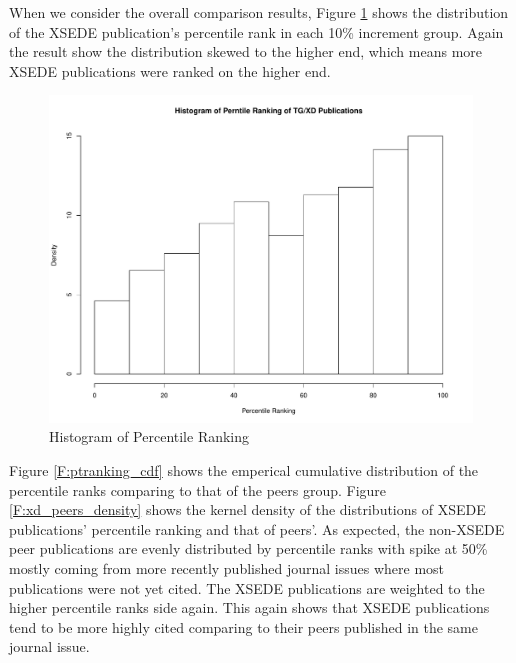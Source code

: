 \documentclass{sig-alternate}
\begin{document}
When we consider the overall comparison results, Figure \ref{F:ptranking_hist} shows
the distribution of the XSEDE publication's percentile rank in each 10\% increment group.
Again the result show the distribution skewed to the higher end, which means more
XSEDE publications were ranked on the higher end.

\begin{figure}[htb!]
    \includegraphics[width=0.95\columnwidth]{images/ptranking_histogram.pdf}
    \caption{Histogram of Percentile Ranking}
    \label{F:ptranking_hist}
\end{figure}

Figure \ref{F:ptranking_cdf} shows the emperical cumulative distribution of the
percentile ranks comparing to that of the peers group.
Figure \ref{F:xd_peers_density} shows the kernel density of the distributions
of XSEDE publications' percentile ranking and that of peers'. As expected,
the non-XSEDE peer publications are evenly distributed by percentile
ranks with spike at 50\% mostly coming from more recently published journal
issues where most publications were not yet cited. The XSEDE publications are
weighted to the higher percentile ranks side again. This again shows that XSEDE
publications tend to be more highly cited comparing to their peers published in
the same journal issue.
\end{document}

